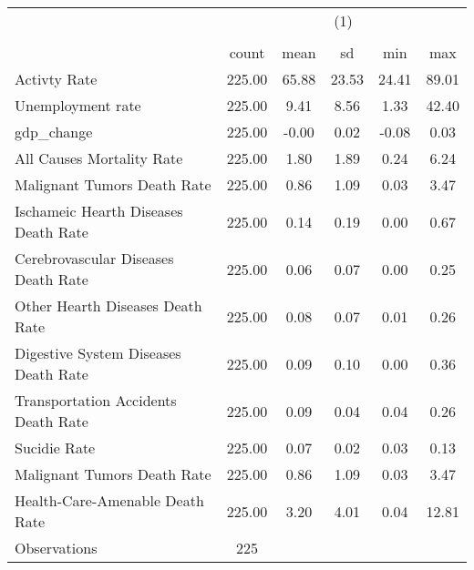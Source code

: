 {
\def\sym#1{\ifmmode^{#1}\else\(^{#1}\)\fi}
\begin{tabular}{l*{1}{ccccc}}
\hline\hline
                    &\multicolumn{5}{c}{(1)}                                                  \\
                    &\multicolumn{5}{c}{}                                                     \\
                    &       count         &        mean&          sd&         min&         max\\
\hline
Activty Rate        &      225.00         &       65.88&       23.53&       24.41&       89.01\\
Unemployment rate   &      225.00         &        9.41&        8.56&        1.33&       42.40\\
gdp\_change          &      225.00         &       -0.00&        0.02&       -0.08&        0.03\\
All Causes Mortality Rate&      225.00         &        1.80&        1.89&        0.24&        6.24\\
Malignant Tumors Death Rate&      225.00         &        0.86&        1.09&        0.03&        3.47\\
Ischameic Hearth Diseases Death Rate&      225.00         &        0.14&        0.19&        0.00&        0.67\\
Cerebrovascular Diseases Death Rate&      225.00         &        0.06&        0.07&        0.00&        0.25\\
Other Hearth Diseases Death Rate&      225.00         &        0.08&        0.07&        0.01&        0.26\\
Digestive System Diseases Death Rate&      225.00         &        0.09&        0.10&        0.00&        0.36\\
Transportation Accidents Death Rate&      225.00         &        0.09&        0.04&        0.04&        0.26\\
Sucidie Rate        &      225.00         &        0.07&        0.02&        0.03&        0.13\\
Malignant Tumors Death Rate&      225.00         &        0.86&        1.09&        0.03&        3.47\\
Health-Care-Amenable Death Rate&      225.00         &        3.20&        4.01&        0.04&       12.81\\
\hline
Observations        &         225         &            &            &            &            \\
\hline\hline
\end{tabular}
}
